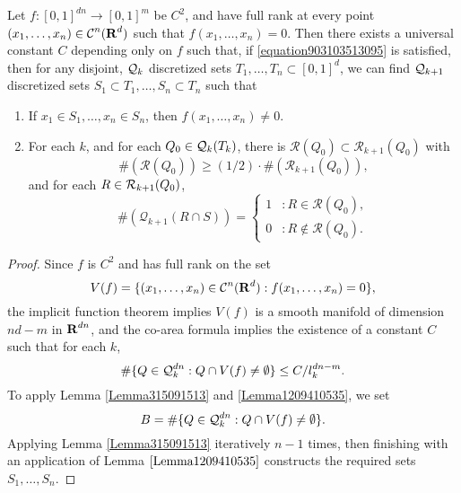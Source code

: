 \begin{corollary} \label{PramanikFraserBuildingBlockLemma}
    Let $f: [0,1]^{dn} \to [0,1]^m$ be $C^2$, and have full rank at every point $(x_1, \dots, x_n) \in \operatorname{\mathcal{C}}^n(\operatorname{\mathbf{R}}^d)$ such that $f(x_1, \dots, x_n) = 0$. Then there exists a universal constant $C$ depending only on $f$ such that, if \eqref{equation903103513095} is satisfied, then for any disjoint, $\operatorname{\mathcal{Q}}_k$ discretized sets $T_1, \dots, T_n \subset [0,1]^d$, we can find $\operatorname{\mathcal{Q}}_{k+1}$ discretized sets $S_1 \subset T_1, \dots, S_n \subset T_n$ such that
    \begin{enumerate}
        \item If $x_1 \in S_1, \dots, x_n \in S_n$, then $f(x_1, \dots, x_n) \neq 0$.
        \item For each $k$, and for each $Q_0 \in \operatorname{\mathcal{Q}}_k(T_k)$, there is $\mathcal{R}(Q_0) \subset \mathcal{R}_{k+1}(Q_0)$ with
        \[ \#(\mathcal{R}(Q_0)) \geq (1/2) \cdot \#(\mathcal{R}_{k+1}(Q_0)), \]
        and for each $R \in \operatorname{\mathcal{R}}_{k+1}(Q_0)$,
        \[ \#(\mathcal{Q}_{k+1}(R \cap S)) = \begin{cases} 1 &: R \in \mathcal{R}(Q_0), \\ 0 &: R \not \in \mathcal{R}(Q_0). \end{cases} \]
    \end{enumerate}
\end{corollary}
\begin{proof}
    Since $f$ is $C^2$ and has full rank on the set
    \[ V(f) = \{ (x_1, \dots, x_n) \in \operatorname{\mathcal{C}}^n(\operatorname{\mathbf{R}}^d) : f(x_1, \dots, x_n) = 0 \}, \]
    the implicit function theorem implies $V(f)$ is a smooth manifold of dimension $nd - m$ in $\operatorname{\mathbf{R}}^{dn}$, and the co-area formula implies the existence of a constant $C$ such that for each $k$,
    \[ \# \{ Q \in \operatorname{\mathcal{Q}}_k^{dn} : Q \cap V(f) \neq \emptyset \} \leq C/l_k^{dn-m}. \]
    To apply Lemma \ref{Lemma315091513} and \ref{Lemma1209410535}, we set
    \[ B = \# \{ Q \in \operatorname{\mathcal{Q}}_k^{dn} : Q \cap V(f) \neq \emptyset \}. \]
    Applying Lemma \ref{Lemma315091513} iteratively $n-1$ times, then finishing with an application of Lemma $\ref{Lemma1209410535}$ constructs the required sets $S_1, \dots, S_n$.
\end{proof}

